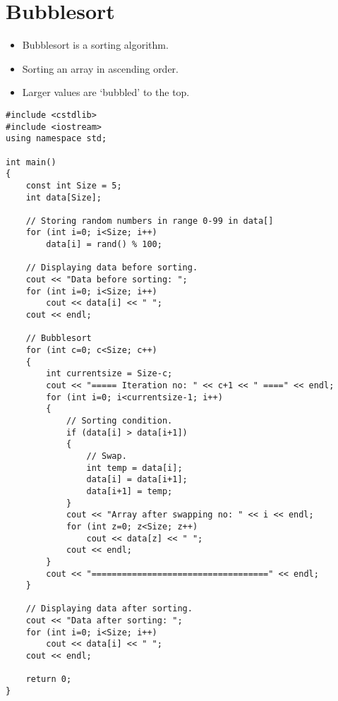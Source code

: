 \documentclass[12pt,a4paper]{article}
\begin{document}
\section{Bubblesort}
\begin{itemize}
\item Bubblesort is a sorting algorithm.
\item Sorting an array in ascending order.
\item Larger values are `bubbled' to the top.
\end{itemize}
\begin{lstlisting}[caption={Bubble Sort}]
#include <cstdlib>
#include <iostream>
using namespace std;

int main()
{
	const int Size = 5;
	int data[Size];

	// Storing random numbers in range 0-99 in data[]
	for (int i=0; i<Size; i++)
		data[i] = rand() % 100;
		
	// Displaying data before sorting.
	cout << "Data before sorting: ";
	for (int i=0; i<Size; i++)
		cout << data[i] << " ";
	cout << endl;

	// Bubblesort
	for (int c=0; c<Size; c++)
	{
		int currentsize = Size-c;
		cout << "===== Iteration no: " << c+1 << " ====" << endl;
		for (int i=0; i<currentsize-1; i++)
		{
			// Sorting condition.
			if (data[i] > data[i+1])
			{
				// Swap.
				int temp = data[i];
				data[i] = data[i+1];
				data[i+1] = temp;
			}
			cout << "Array after swapping no: " << i << endl;
			for (int z=0; z<Size; z++)
				cout << data[z] << " ";
			cout << endl;
		}
		cout << "===================================" << endl;
	}

	// Displaying data after sorting.
	cout << "Data after sorting: ";
	for (int i=0; i<Size; i++)
		cout << data[i] << " ";
	cout << endl;
	
	return 0;
}
\end{lstlisting}
\end{document}
